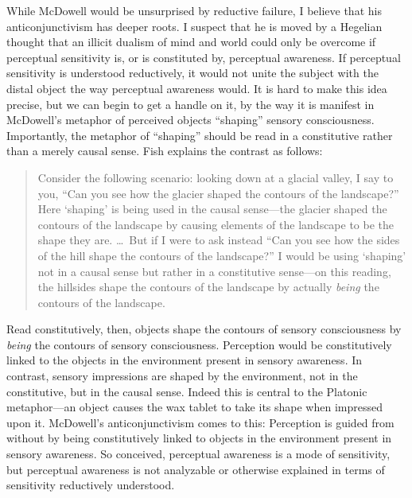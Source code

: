 \documentclass[12pt]{article}
\begin{document}
While McDowell would be unsurprised by reductive failure, I believe that his anticonjunctivism has deeper roots. I suspect that he is moved by a Hegelian thought that an illicit dualism of mind and world could only be overcome if perceptual sensitivity is, or is constituted by, perceptual awareness. If perceptual sensitivity is understood reductively, it would not unite the subject with the distal object the way perceptual awareness would. It is hard to make this idea precise, but we can begin to get a handle on it, by the way it is manifest in McDowell's metaphor of perceived objects ``shaping'' sensory consciousness. Importantly, the metaphor of ``shaping'' should be read in a constitutive rather than a merely causal sense. Fish explains the contrast as follows:
\begin{quote}
	Consider the following scenario: looking down at a glacial valley, I say to you, ``Can you see how the glacier shaped the contours of the landscape?'' Here `shaping' is being used in the causal sense---the glacier shaped the contours of the landscape by causing elements of the landscape to be the shape they are. \ldots\ But if I were to ask instead ``Can you see how the sides of the hill shape the contours of the landscape?'' I would be using `shaping' not in a causal sense but rather in a constitutive sense---on this reading, the hillsides shape the contours of the landscape by actually \emph{being} the contours of the landscape. \citep[6]{Fish:2009fk}
\end{quote}
Read constitutively, then, objects shape the contours of sensory consciousness by \emph{being} the contours of sensory consciousness. Perception would be constitutively linked to the objects in the environment present in sensory awareness. In contrast, sensory impressions are shaped by the environment, not in the constitutive, but in the causal sense. Indeed this is central to the Platonic metaphor---an object causes the wax tablet to take its shape when impressed upon it. McDowell's anticonjunctivism comes to this: Perception is guided from without by being constitutively linked to objects in the environment present in sensory awareness. So conceived, perceptual awareness is a mode of sensitivity, but perceptual awareness is not analyzable or otherwise explained in terms of sensitivity reductively understood.
\end{document}
